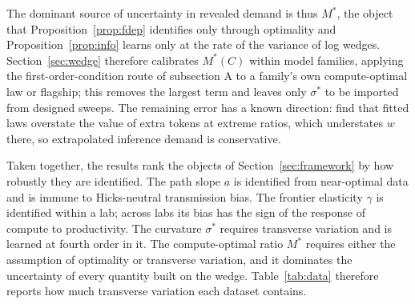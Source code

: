 The dominant source of uncertainty in revealed demand is thus $M^*$, the object that Proposition~\ref{prop:fdep}
identifies only through optimality and Proposition~\ref{prop:info} learns only at the rate of the variance of log
wedges. Section~\ref{sec:wedge} therefore calibrates $M^*(C)$ within model families, applying the first-order-condition
route of subsection A to a family's own compute-optimal law or flagship; this removes the largest term and leaves only
$\sigma^*$ to be imported from designed sweeps. The remaining error has a known direction: \citet{sardana2024beyond}
find that fitted laws overstate the value of extra tokens at extreme ratios, which understates $w$ there, so
extrapolated inference demand is conservative.

Taken together, the results rank the objects of Section~\ref{sec:framework} by how robustly they are identified. The
path slope $a$ is identified from near-optimal data and is immune to Hicks-neutral transmission bias. The frontier
elasticity $\gamma$ is identified within a lab; across labs its bias has the sign of the response of compute to
productivity. The curvature
$\sigma^*$ requires transverse variation and is learned at fourth order in it. The compute-optimal ratio $M^*$ requires
either the assumption of optimality or transverse variation, and it dominates the uncertainty of every quantity built on
the wedge. Table~\ref{tab:data} therefore reports how much transverse variation each dataset contains.
